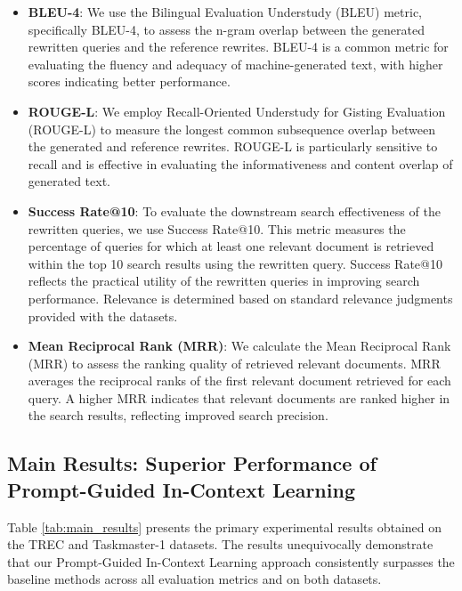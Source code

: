 \begin{itemize}
    \item \textbf{BLEU-4}: We use the Bilingual Evaluation Understudy (BLEU) metric, specifically BLEU-4, to assess the n-gram overlap between the generated rewritten queries and the reference rewrites. BLEU-4 is a common metric for evaluating the fluency and adequacy of machine-generated text, with higher scores indicating better performance.
    \item \textbf{ROUGE-L}:  We employ Recall-Oriented Understudy for Gisting Evaluation (ROUGE-L) to measure the longest common subsequence overlap between the generated and reference rewrites. ROUGE-L is particularly sensitive to recall and is effective in evaluating the informativeness and content overlap of generated text.
    \item \textbf{Success Rate@10}:  To evaluate the downstream search effectiveness of the rewritten queries, we use Success Rate@10. This metric measures the percentage of queries for which at least one relevant document is retrieved within the top 10 search results using the rewritten query.  Success Rate@10 reflects the practical utility of the rewritten queries in improving search performance. Relevance is determined based on standard relevance judgments provided with the datasets.
    \item \textbf{Mean Reciprocal Rank (MRR)}: We calculate the Mean Reciprocal Rank (MRR) to assess the ranking quality of retrieved relevant documents. MRR averages the reciprocal ranks of the first relevant document retrieved for each query.  A higher MRR indicates that relevant documents are ranked higher in the search results, reflecting improved search precision.
\end{itemize}


\subsection{Main Results: Superior Performance of Prompt-Guided In-Context Learning}

Table \ref{tab:main_results} presents the primary experimental results obtained on the TREC and Taskmaster-1 datasets.  The results unequivocally demonstrate that our Prompt-Guided In-Context Learning approach consistently surpasses the baseline methods across all evaluation metrics and on both datasets.

